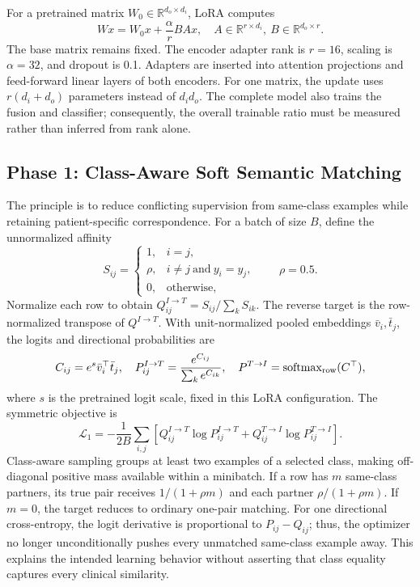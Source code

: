 \documentclass{llncs}
\begin{document}
For a pretrained matrix $W_0\in\mathbb R^{d_o\times d_i}$, LoRA computes
\begin{equation}
Wx=W_0x+\frac{\alpha}{r}BAx,
\quad A\in\mathbb R^{r\times d_i},\ B\in\mathbb R^{d_o\times r}.
\label{eq:lora}
\end{equation}
The base matrix remains fixed. The encoder adapter rank is $r=16$, scaling is $\alpha=32$, and dropout is 0.1. Adapters are inserted into attention projections and feed-forward linear layers of both encoders. For one matrix, the update uses $r(d_i+d_o)$ parameters instead of $d_id_o$. The complete model also trains the fusion and classifier; consequently, the overall trainable ratio must be measured rather than inferred from rank alone.

\subsection{Phase 1: Class-Aware Soft Semantic Matching}
The principle is to reduce conflicting supervision from same-class examples while retaining patient-specific correspondence. For a batch of size $B$, define the unnormalized affinity
\begin{equation}
S_{ij}=\begin{cases}
1,&i=j,\\
\rho,&i\ne j\ \text{and}\ y_i=y_j,\\
0,&\text{otherwise},
\end{cases}\qquad \rho=0.5.
\label{eq:target}
\end{equation}
Normalize each row to obtain $Q^{I\to T}_{ij}=S_{ij}/\sum_kS_{ik}$. The reverse target is the row-normalized transpose of $Q^{I\to T}$. With unit-normalized pooled embeddings $\bar v_i,\bar t_j$, the logits and directional probabilities are
\begin{equation}
C_{ij}=e^s\bar v_i^\top\bar t_j,
\quad P^{I\to T}_{ij}=\frac{e^{C_{ij}}}{\sum_k e^{C_{ik}}},
\quad P^{T\to I}=\operatorname{softmax}_{\rm row}(C^\top),
\label{eq:contrastive}
\end{equation}
where $s$ is the pretrained logit scale, fixed in this LoRA configuration. The symmetric objective is
\begin{equation}
\mathcal L_1=-\frac{1}{2B}\sum_{i,j}\left[
Q^{I\to T}_{ij}\log P^{I\to T}_{ij}+
Q^{T\to I}_{ij}\log P^{T\to I}_{ij}\right].
\label{eq:loss1}
\end{equation}
Class-aware sampling groups at least two examples of a selected class, making off-diagonal positive mass available within a minibatch. If a row has $m$ same-class partners, its true pair receives $1/(1+\rho m)$ and each partner $\rho/(1+\rho m)$. If $m=0$, the target reduces to ordinary one-pair matching. For one directional cross-entropy, the logit derivative is proportional to $P_{ij}-Q_{ij}$; thus, the optimizer no longer unconditionally pushes every unmatched same-class example away. This explains the intended learning behavior without asserting that class equality captures every clinical similarity.
\end{document}
